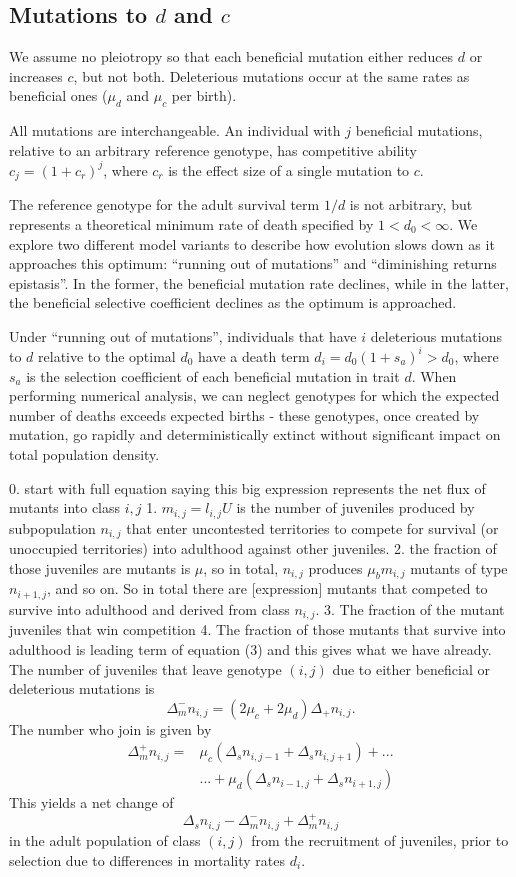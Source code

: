 \documentclass[9pt,twocolumn,twoside]{article}
\begin{document}
\subsection{Mutations to $d$ and $c$}

We assume no pleiotropy so that each beneficial mutation either reduces $d$ or increases $c$, but not both. Deleterious mutations occur at the same rates as beneficial ones ($\mu_d$ and $\mu_c$ per birth).

All mutations are interchangeable. An individual with $j$ beneficial mutations, relative to an arbitrary reference genotype, has competitive ability  $c_j = (1+c_r)^j$, where $c_r$ is the effect size of a single mutation to $c$. 

The reference genotype for the adult survival term $1/d$ is not arbitrary, but represents a theoretical minimum rate of death specified by $1 < d_0 < \infty$. We explore two different model variants to describe how evolution slows down as it approaches this optimum: ``running out of mutations'' and ``diminishing returns epistasis''. In the former, the beneficial mutation rate declines, while in the latter, the beneficial selective coefficient declines as the optimum is approached.

Under ``running out of mutations'', individuals that have $i$ deleterious mutations to $d$ relative to the optimal $d_0$ have a death term $d_i = d_0(1+s_a)^i  > d_0 $, where $s_a$ is the selection coefficient of each beneficial mutation in trait $d$. When performing numerical analysis, we can neglect genotypes for which the expected number of deaths exceeds expected births - these genotypes, once created by mutation, go rapidly and deterministically extinct without significant impact on total population density.

0. start with full equation saying this big expression represents the net flux of mutants into class ${i,j}$
1. $m_{i,j}=l_{i,j} U$ is the number of juveniles produced by subpopulation $n_{i,j}$ that  enter uncontested territories to compete for survival (or unoccupied territories) into adulthood against other juveniles.
2. the fraction of those juveniles are mutants is $\mu$, so in total, $n_{i,j}$ produces $\mu_b m_{i,j}$ mutants of type $n_{i+1,j}$, and so on. So in total there are [expression] mutants that competed to survive into adulthood and derived from class $n_{i,j}$.
3. The fraction of the mutant juveniles that win competition
4. The fraction of those mutants that survive into adulthood is 
leading term of equation (3) and this gives what we have already.
The number of juveniles that leave genotype $(i,j)$ due to either beneficial or deleterious mutations is
\[
\Delta_{m}^- n_{i,j} = (2\mu_c+2\mu_d)\Delta_+ n_{i,j}.
\]
The number who join is given by
\[
\begin{aligned}
\Delta_{m}^+ n_{i,j} =& \mu_c(\Delta_s n_{i,j-1}+\Delta_s n_{i,j+1}) +...\\&...+\mu_d(\Delta_s n_{i-1,j}+\Delta_s n_{i+1,j})
\end{aligned}
\]
This yields a net change of 
\[
\Delta_s n_{i,j} - \Delta_{m}^- n_{i,j}+\Delta_{m}^+ n_{i,j}
\]
in the adult population of class $(i,j)$ from the recruitment of juveniles, prior to selection due to differences in mortality rates $d_i$. 
\end{document}
